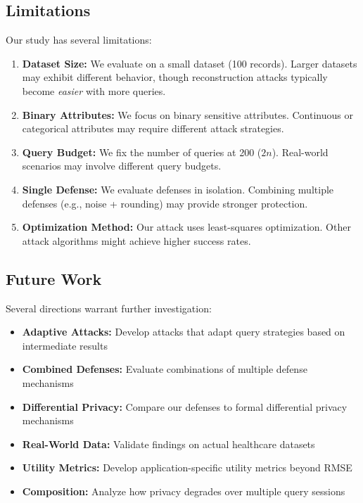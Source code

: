 \documentclass[11pt,letterpaper]{article}
\begin{document}
\subsection{Limitations}

Our study has several limitations:

\begin{enumerate}[leftmargin=*]
    \item \textbf{Dataset Size:} We evaluate on a small dataset (100 records). Larger datasets may exhibit different behavior, though reconstruction attacks typically become \textit{easier} with more queries.
    
    \item \textbf{Binary Attributes:} We focus on binary sensitive attributes. Continuous or categorical attributes may require different attack strategies.
    
    \item \textbf{Query Budget:} We fix the number of queries at 200 ($2n$). Real-world scenarios may involve different query budgets.
    
    \item \textbf{Single Defense:} We evaluate defenses in isolation. Combining multiple defenses (e.g., noise + rounding) may provide stronger protection.
    
    \item \textbf{Optimization Method:} Our attack uses least-squares optimization. Other attack algorithms might achieve higher success rates.
\end{enumerate}

\subsection{Future Work}

Several directions warrant further investigation:

\begin{itemize}[leftmargin=*]
    \item \textbf{Adaptive Attacks:} Develop attacks that adapt query strategies based on intermediate results
    \item \textbf{Combined Defenses:} Evaluate combinations of multiple defense mechanisms
    \item \textbf{Differential Privacy:} Compare our defenses to formal differential privacy mechanisms
    \item \textbf{Real-World Data:} Validate findings on actual healthcare datasets
    \item \textbf{Utility Metrics:} Develop application-specific utility metrics beyond RMSE
    \item \textbf{Composition:} Analyze how privacy degrades over multiple query sessions
\end{itemize}
\end{document}
